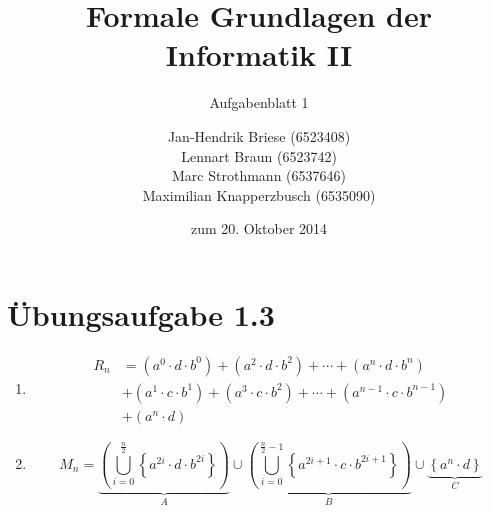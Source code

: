 \documentclass[a4paper]{scrartcl}
\title{Formale Grundlagen der Informatik II}
\subtitle{Aufgabenblatt 1}
\author{
    Jan-Hendrik Briese (6523408) \\
    Lennart Braun (6523742) \\
    Marc Strothmann (6537646) \\
    Maximilian Knapperzbusch (6535090)
}
\date{zum 20. Oktober 2014}
\begin{document}
\maketitle

\section*{Übungsaufgabe 1.3}
\begin{enumerate}
    \item
        \begin{equation}
            \label{equ:13r}
            \begin{split}
                R_n &= (a^0 \cdot d \cdot b^0) + (a^2 \cdot d \cdot b^2) + \cdots + (a^n \cdot d \cdot b^n) \\
                  &+ (a^1 \cdot c \cdot b^1) + (a^3 \cdot c \cdot b^2) + \cdots + (a^{n-1} \cdot c \cdot b^{n-1}) \\
                  &+ (a^n \cdot d)
            \end{split}
        \end{equation}
        
    \item
        \begin{equation}
            M_n = \underbrace{\left( \bigcup_{i=0}^{\frac{n}{2}} \left\{ a^{2i} \cdot d \cdot b^{2i} \right\} \right)}_A
            \cup \underbrace{\left( \bigcup_{i=0}^{\frac{n}{2}-1} \left\{ a^{2i+1} \cdot c \cdot b^{2i+1} \right\} \right)}_B
            \cup \underbrace{\left\{ a^n \cdot d \right\}}_C
        \end{equation}
        

\end{enumerate}
\end{document}
